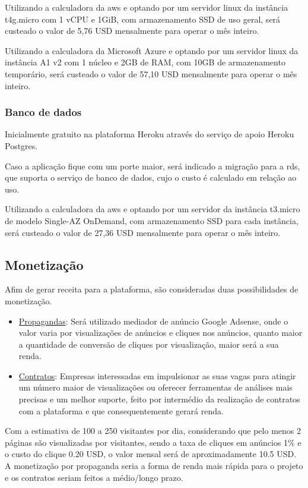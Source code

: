 Utilizando a calculadora da \gls{aws} e optando por um servidor \gls{linux} da instância
t4g.micro com 1 vCPU e 1GiB, com armazenamento SSD de uso geral, será
custeado o valor de 5,76 USD mensalmente para operar o mês inteiro.

Utilizando a calculadora da Microsoft Azure e optando por um servidor \gls{linux} da
instância A1 v2 com 1 núcleo e 2GB de RAM, com 10GB de armazenamento temporário, será 
custeado o valor de 57,10 USD mensalmente para operar o mês inteiro.

\subsubsection{Banco de dados}
Inicialmente gratuito na plataforma Heroku através do serviço de apoio Heroku Postgres.

Caso a aplicação fique com um porte maior, será indicado a migração para a \gls{rds}, que suporta o serviço de banco de dados, cujo o custo é calculado em relação ao uso.

Utilizando a calculadora da \gls{aws} e optando por um servidor da instância t3.micro
de modelo Single-AZ OnDemand, com armazenamento SSD para cada instância,
será custeado o valor de 27,36 USD mensalmente para operar o mês inteiro.

\subsection{Monetização}
Afim de gerar receita para a plataforma, são consideradas duas possibilidades de monetização.

\begin{itemize}
    \item \underline{Propagandas}: Será utilizado mediador de anúncio Google Adsense, 
    onde o valor varia por visualizações de anúncios e cliques nos anúncios, quanto maior a quantidade de conversão
    de cliques por visualização, maior será a sua renda. 
    \item \underline{Contratos}: Empresas interessadas em impulsionar as suas vagas para atingir um número maior de visualizações ou 
    oferecer ferramentas de análises mais precisas e um melhor suporte, feito por intermédio da realização de contratos com a plataforma e 
    que consequentemente gerará renda.
\end{itemize}

Com a estimativa de 100 a 250 visitantes por dia, considerando que pelo menos 2 páginas são visualizadas por visitantes,
sendo a taxa de cliques em anúncios 1\% e o custo do clique 0.20 USD, o valor mensal será de aproximadamente 10.5 USD.
A monetização por propaganda seria a forma de renda mais rápida para o projeto e os contratos seriam feitos
a médio/longo prazo.

